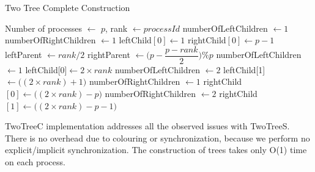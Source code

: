 \documentclass[sigplan,review,anonymous]{acmart}\settopmatter{printfolios=true,printccs=false,printacmref=false}
\begin{document}

\begin{algorithm}
 \scriptsize
\caption{Two Tree Complete Construction}\label{alg:TwoTreeComp}
\begin{algorithmic}[1]
\REQUIRE Number of processes $\leftarrow$ \(p\), rank $\leftarrow processId$ 
    \STATE numberOfLeftChildren $ \leftarrow 1$
    \STATE numberOfRightChildren $ \leftarrow 1$
    \STATE leftChild$[0] \leftarrow 1$
    \STATE rightChild$[0] \leftarrow p-1$
    \STATE leftParent $ \leftarrow rank / 2$
    \STATE rightParent $ \leftarrow \big(p-\dfrac{p-rank}{2}\big)\%p$
         \STATE numberOfLeftChildren $ \leftarrow 1$
         \STATE leftChild[0]$ \leftarrow 2 \times rank$
    \ENDIF
         \STATE numberOfLeftChildren $ \leftarrow 2$
         \STATE leftChild[1]$ \leftarrow \big((2 \times rank) + 1\big)$
    \ENDIF
         \STATE numberOfRightChildren $ \leftarrow 1$
         \STATE rightChild$[0] \leftarrow \big((2 \times rank) - p\big)$
    \ENDIF
         \STATE numberOfRightChildren $ \leftarrow 2$
         \STATE rightChild$[1] \leftarrow \big((2 \times rank) - p - 1\big)$
    \ENDIF
\ENDIF
\end{algorithmic}
\end{algorithm}

TwoTreeC implementation addresses all the observed issues with TwoTreeS. There is no overhead due to colouring or synchronization, because we perform no explicit/implicit synchronization. The construction of trees takes only O(1) time on each process.
\end{document}
